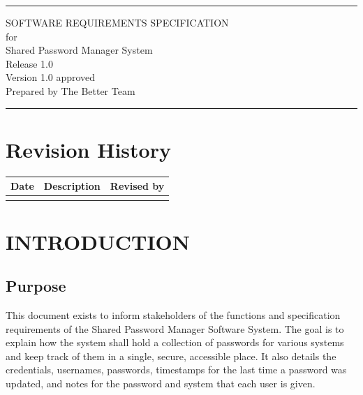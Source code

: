 \documentclass[letterpaper,12pt,oneside,listof=totoc]{scrreprt}
\date{\today}
\author{} %
\def\myversion{1.0 }
\begin{document}
\begin{titlepage}
\flushright
\rule{\textwidth}{5pt}\vskip1cm
\Huge{SOFTWARE REQUIREMENTS SPECIFICATION}\\
\vspace{1.5cm}
for\\
\vspace{1.5cm}
Shared Password Manager System\\                      %
\vspace{1.5cm}
\LARGE{Release 1.0\\}
\vspace{1.5cm}
\LARGE{Version \myversion approved\\}
\vspace{1.5cm}
Prepared by The Better Team\\
\vfill
\rule{\textwidth}{5pt}
\end{titlepage}

\tableofcontents
\listoffigures
\listoftables

\chapter*{Revision History}

\begin{table}[ht]
\centering
\begin{tabular}{| c | p{} | p{} |}
\hline
Date & Description & Revised by \\
\hline
 &  &  \\
\hline
\end{tabular}
\end{table}




\chapter{INTRODUCTION}

\section{Purpose}
This document exists to inform stakeholders of the functions and specification requirements of the Shared Password Manager Software System. The goal is to explain how the system shall hold a collection of passwords for various systems and keep track of them in a single, secure, accessible place. It also details the credentials, usernames, passwords, timestamps for the last time a password was updated, and notes for the password and system that each user is given. 
\end{document}
